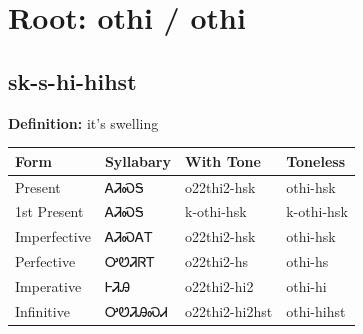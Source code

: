 \documentclass{article}%
\begin{document}
%
\normalsize%
\section*{Root: othi / othi}%
\subsection*{sk-s-hi-hihst}%
\textbf{Definition: }%
it’s swelling%
\\[0.5em]%
\begin{tabular}{|l|l|l|l|}%
\hline%
\textbf{Form}&\textbf{Syllabary}&\textbf{With Tone}&\textbf{Toneless}\\%
\hline%
Present&ᎪᏘᏍᎦ&o22thi2{-}hsk&othi{-}hsk\\%
1st Present&ᎪᏘᏍᎦ&k{-}othi{-}hsk&k{-}othi{-}hsk\\%
Imperfective&ᎪᏘᏍᎪᎢ&o22thi2{-}hsk&othi{-}hsk\\%
Perfective&ᎤᏬᏘᏒᎢ&o22thi2{-}hs&othi{-}hs\\%
Imperative&ᎰᏘᎯ&o22thi2{-}hi2&othi{-}hi\\%
Infinitive&ᎤᏬᏘᎯᏍᏗ&o22thi2{-}hi2hst&othi{-}hihst\\%
\hline%
\end{tabular}%
\\[1em]%
\end{document}
